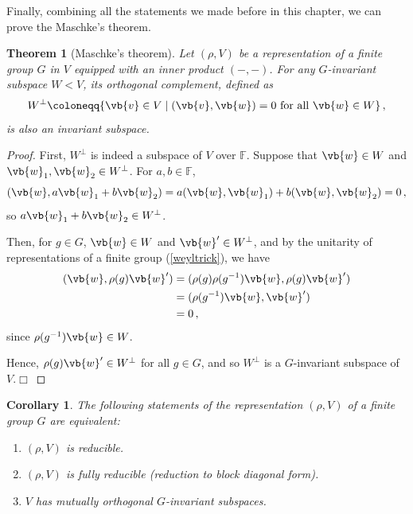 \documentclass{article}
\theoremstyle{plain}\theoremheaderfont{\normalfont\itshape}\theorembodyfont{\rmfamily}\theoremseparator{.}\newtheorem*{rem}{Remark}\newtheorem*{ex}{Example}\newtheorem*{proof}{Proof}\newtheorem*{altp}{Alternative proof}
\theoremstyle{plain}\theoremheaderfont{\normalfont\bfseries}\theorembodyfont{\rmfamily}\theoremseparator{.}\newtheorem{thm}{Theorem}[section]\newtheorem{lem}[thm]{Lemma}\newtheorem{prop}[thm]{Proposition}\newtheorem*{cor}{Corollary}\newtheorem{defn}[thm]{Definition}\newtheorem{clm}[thm]{Claim}\newtheorem{clminproof}{Claim}
\theoremstyle{break}\theoremheaderfont{\normalfont\itshape}\theorembodyfont{\rmfamily}\theoremseparator{.\medskip}\newtheorem*{proofskip}{Proof}\newtheorem*{exs}{Examples}\newtheorem*{rems}{Remarks}
\theoremstyle{break}\theoremheaderfont{\normalfont\bfseries}\theorembodyfont{\rmfamily}\theoremseparator{.\medskip}\newtheorem{lemskip}[thm]{Lemma}\newtheorem{defnskip}[thm]{Definition}\newtheorem{propskip}[thm]{Proposition}\newtheorem{thmskip}[thm]{Theorem}
\numberwithin{equation}{section}
\newcommand{\qed}{\hfill\ensuremath{\Box}}
\begin{document}
	Finally, combining all the statements we made before in this chapter, we can prove the Maschke's theorem.
	\begin{thm}[Maschke's theorem]
		Let \((\rho,V)\) be a representation of a finite group \(G\) in \(V\) equipped with an inner product \((-,-)\). For any \(G\)-invariant subspace \(W<V\), its \textit{orthogonal complement}, defined as
		\[W^\perp \coloneqq\{\vb{v}\in V\mid (\vb{v},\vb{w})=0\text{ for all }\vb{w}\in W\}\,,\]
		is also an invariant subspace.
	\end{thm}
	\begin{proof}
		First, \(W^\perp\) is indeed a subspace of \(V\) over \(\mathbb{F}\). Suppose that \(\vb{w}\in W\) and \(\vb{w}_1,\vb{w}_2\in W^\perp\). For \(a,b\in\mathbb{F}\),
		\[(\vb{w},a\vb{w}_1+b\vb{w}_2)=a(\vb{w},\vb{w}_1)+b(\vb{w},\vb{w}_2)=0\,,\]
		so \(a\vb{w}_1+b\vb{w}_2\in W^\perp\).

		Then, for \(g\in G\), \(\vb{w}\in W\) and \(\vb{w}'\in W^\perp\),	and by the unitarity of representations of a finite group (\cref{weyltrick}), we have
		\begin{align*}
			(\vb{w},\rho(g)\vb{w}')&=(\rho(g)\rho(g^{-1})\vb{w},\rho(g)\vb{w}')\\
			&=(\rho(g^{-1})\vb{w},\vb{w}')\\
			&=0\,,
		\end{align*}
		since \(\rho(g^{-1})\vb{w}\in W\).

		Hence, \(\rho(g)\vb{w}'\in W^\perp\) for all \(g\in G\), and so \(W^\perp\) is a \(G\)-invariant subspace of \(V\).\qed
	\end{proof}
	\begin{cor}
		The following statements of the representation \((\rho,V)\) of a finite group \(G\) are equivalent:
		\begin{enumerate}[topsep=0pt]
			\item \((\rho,V)\) is reducible.
			\item \((\rho,V)\) is fully reducible (reduction to block diagonal form).
			\item \(V\) has mutually orthogonal \(G\)-invariant subspaces.
		\end{enumerate}
	\end{cor}
\end{document}
